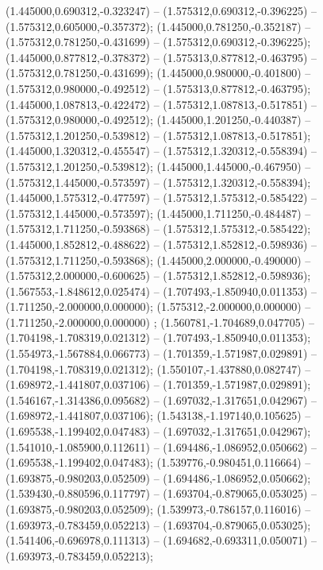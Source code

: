  (1.445000,0.690312,-0.323247) -- (1.575312,0.690312,-0.396225) -- (1.575312,0.605000,-0.357372);
 (1.445000,0.781250,-0.352187) -- (1.575312,0.781250,-0.431699) -- (1.575312,0.690312,-0.396225);
 (1.445000,0.877812,-0.378372) -- (1.575313,0.877812,-0.463795) -- (1.575312,0.781250,-0.431699);
 (1.445000,0.980000,-0.401800) -- (1.575312,0.980000,-0.492512) -- (1.575313,0.877812,-0.463795);
 (1.445000,1.087813,-0.422472) -- (1.575312,1.087813,-0.517851) -- (1.575312,0.980000,-0.492512);
 (1.445000,1.201250,-0.440387) -- (1.575312,1.201250,-0.539812) -- (1.575312,1.087813,-0.517851);
 (1.445000,1.320312,-0.455547) -- (1.575312,1.320312,-0.558394) -- (1.575312,1.201250,-0.539812);
 (1.445000,1.445000,-0.467950) -- (1.575312,1.445000,-0.573597) -- (1.575312,1.320312,-0.558394);
 (1.445000,1.575312,-0.477597) -- (1.575312,1.575312,-0.585422) -- (1.575312,1.445000,-0.573597);
 (1.445000,1.711250,-0.484487) -- (1.575312,1.711250,-0.593868) -- (1.575312,1.575312,-0.585422);
 (1.445000,1.852812,-0.488622) -- (1.575312,1.852812,-0.598936) -- (1.575312,1.711250,-0.593868);
 (1.445000,2.000000,-0.490000) -- (1.575312,2.000000,-0.600625) -- (1.575312,1.852812,-0.598936);
 (1.567553,-1.848612,0.025474) -- (1.707493,-1.850940,0.011353) -- (1.711250,-2.000000,0.000000);
 (1.575312,-2.000000,0.000000) -- (1.711250,-2.000000,0.000000) ;
 (1.560781,-1.704689,0.047705) -- (1.704198,-1.708319,0.021312) -- (1.707493,-1.850940,0.011353);
 (1.554973,-1.567884,0.066773) -- (1.701359,-1.571987,0.029891) -- (1.704198,-1.708319,0.021312);
 (1.550107,-1.437880,0.082747) -- (1.698972,-1.441807,0.037106) -- (1.701359,-1.571987,0.029891);
 (1.546167,-1.314386,0.095682) -- (1.697032,-1.317651,0.042967) -- (1.698972,-1.441807,0.037106);
 (1.543138,-1.197140,0.105625) -- (1.695538,-1.199402,0.047483) -- (1.697032,-1.317651,0.042967);
 (1.541010,-1.085900,0.112611) -- (1.694486,-1.086952,0.050662) -- (1.695538,-1.199402,0.047483);
 (1.539776,-0.980451,0.116664) -- (1.693875,-0.980203,0.052509) -- (1.694486,-1.086952,0.050662);
 (1.539430,-0.880596,0.117797) -- (1.693704,-0.879065,0.053025) -- (1.693875,-0.980203,0.052509);
 (1.539973,-0.786157,0.116016) -- (1.693973,-0.783459,0.052213) -- (1.693704,-0.879065,0.053025);
 (1.541406,-0.696978,0.111313) -- (1.694682,-0.693311,0.050071) -- (1.693973,-0.783459,0.052213);
